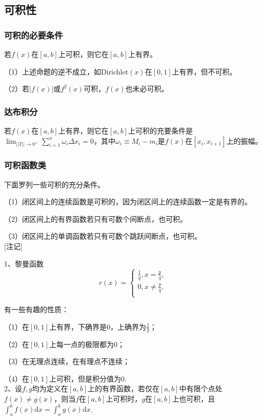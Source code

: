 \documentclass{SCIS2020cn}
\begin{document}
\subsection{可积性}
\subsubsection{可积的必要条件}若$f(x)$在$[a,b]$上可积，则它在$[a,b]$上有界。

（1）上述命题的逆不成立，如Dirichlet$(x)$在$[0,1]$上有界，但不可积。

（2）若$|f(x)|$或$f^2(x)$可积，$f(x)$也未必可积。
\subsubsection{达布积分}
若$f(x)$在$[a,b]$上有界，则它在$[a,b]$上可积的充要条件是$\displaystyle\lim_{||T||\rightarrow0^+}\sum_{i=1}^n{\omega_i\Delta{}x_i=0}$，其中$\omega_i\equiv{}M_i-m_i$是$f(x)$在$[x_i,x_{i+1}]$上的振幅。
\subsubsection{可积函数类}

下面罗列一些可积的充分条件。

（1）闭区间上的连续函数是可积的，因为闭区间上的连续函数一定是有界的。

（2）闭区间上的有界函数若只有可数个间断点，也可积。

（3）闭区间上的单调函数若只有可数个跳跃间断点，也可积。\\

[注记]

1、黎曼函数
$$r(x)=\left\{\begin{array}{ccc}

\frac{1}{q},x=\frac{p}{q},\\

0,x\neq\frac{p}{q}.\\

\end{array}\right.$$

有一些有趣的性质：

（1）在$[0,1]$上有界，下确界是0，上确界为$\displaystyle\frac{1}{2}$；

（2）在$[0,1]$上每一点的极限都为0；

（3）在无理点连续，在有理点不连续；

（4）在$[0,1]$上可积，但是积分值为0.\\

2、设$f,g$均为定义在$[a,b]$上的有界函数，若仅在$[a,b]$中有限个点处$f(x)\neq{}g(x)$，则当$f$在$[a,b]$上可积时，$g$在$[a,b]$上也可积，且$\displaystyle\int_a^b{f(x)\text{d}x}=\int_a^b{g(x)\text{d}x}$.
\end{document}
